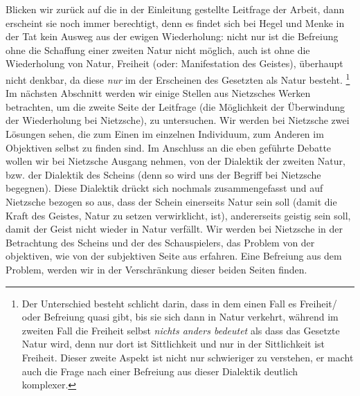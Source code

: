 \documentclass[12pt, a4paper, openany]{report}
\begin{document}
Blicken wir zurück auf die in der Einleitung gestellte Leitfrage der Arbeit, dann erscheint sie noch immer berechtigt, denn es findet sich bei Hegel und Menke in der Tat kein Ausweg aus der ewigen Wiederholung:
nicht nur ist die Befreiung ohne die Schaffung einer zweiten Natur nicht möglich, auch ist ohne die Wiederholung von Natur, Freiheit (oder: Manifestation des Geistes), überhaupt nicht denkbar, da diese \emph{nur} im der Erscheinen des Gesetzten als Natur besteht.%
\footnote{
    Der Unterschied besteht schlicht darin, dass in dem einen Fall es Freiheit/ oder Befreiung quasi  gibt, bis sie sich dann in Natur verkehrt, während im zweiten Fall die Freiheit selbst \emph{nichts anders bedeutet} als dass das Gesetzte Natur wird, denn nur dort ist Sittlichkeit und nur in der Sittlichkeit ist Freiheit.
    Dieser zweite Aspekt ist nicht nur schwieriger zu verstehen, er macht auch die Frage nach einer Befreiung aus dieser Dialektik deutlich komplexer.
}
Im nächsten Abschnitt werden wir einige Stellen aus Nietzsches Werken betrachten, um die zweite Seite der Leitfrage (die Möglichkeit der Überwindung der Wiederholung bei Nietzsche), zu untersuchen.
Wir werden bei Nietzsche zwei Lösungen sehen, die zum Einen im einzelnen Individuum, zum Anderen im Objektiven selbst zu finden sind.
Im Anschluss an die eben geführte Debatte wollen wir bei Nietzsche Ausgang nehmen, von der Dialektik der zweiten Natur, bzw. der Dialektik des Scheins (denn so wird uns der Begriff bei Nietzsche begegnen).
Diese Dialektik drückt sich nochmals zusammengefasst und auf Nietzsche bezogen so aus, dass der Schein einerseits Natur sein soll (damit die Kraft des Geistes, Natur zu setzen verwirklicht, ist), andererseits geistig sein soll, damit der Geist nicht wieder in Natur verfällt. 
Wir werden bei Nietzsche in der Betrachtung des Scheins und der des Schauspielers, das Problem von der objektiven, wie von der subjektiven Seite aus erfahren. 
Eine Befreiung aus dem Problem, werden wir in der Verschränkung dieser beiden Seiten finden. 
\end{document}
